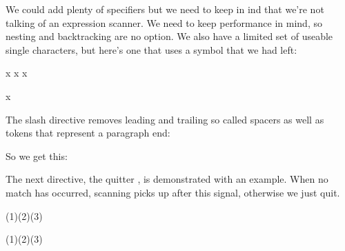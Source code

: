 We could add plenty of specifiers but we need to keep in ind that we're not
talking of an expression scanner. We need to keep performance in mind, so nesting
and backtracking are no option. We also have a limited set of useable single
characters, but here's one that uses a symbol that we had left:

\startbuffer[definition]
\stopbuffer

\typebuffer[definition][option=TEX] \getbuffer[definition]

\startbuffer[example]
\startfoo [x ] x \stopfoo
\startfoo [ x ] x \stopfoo
\startfoo [ x] x \stopfoo
\startfoo [ x] \par x \par \par \stopfoo
\stopbuffer

The slash directive removes leading and trailing so called spacers as well as tokens
that represent a paragraph end:

\typebuffer[example][option=TEX]

So we get this:

\getbuffer[example]

The next directive, the quitter \type {#;}, is demonstrated with an example. When
no match has occurred, scanning picks up after this signal, otherwise we just
quit.

\startbuffer[example]
\tolerant{}

\foo[1]\quad\foo[2]\quad\foo[3]\par
\foo(1)\quad\foo(2)\quad\foo(3)\par

\tolerant{}

\foo[1]\quad\foo[2]\quad\foo[3]\par
{}\quad{}\quad{}\par

\tolerant{}

\foo[1]\quad\foo[2]\quad\foo[3]\par
{}\quad{}\quad{}\par

\tolerant{}

\foo[1]\quad\foo[2]\quad\foo[3]\par
\foo(1)\quad\foo(2)\quad\foo(3)\par
{}\quad{}\quad{}\par
\stopbuffer

